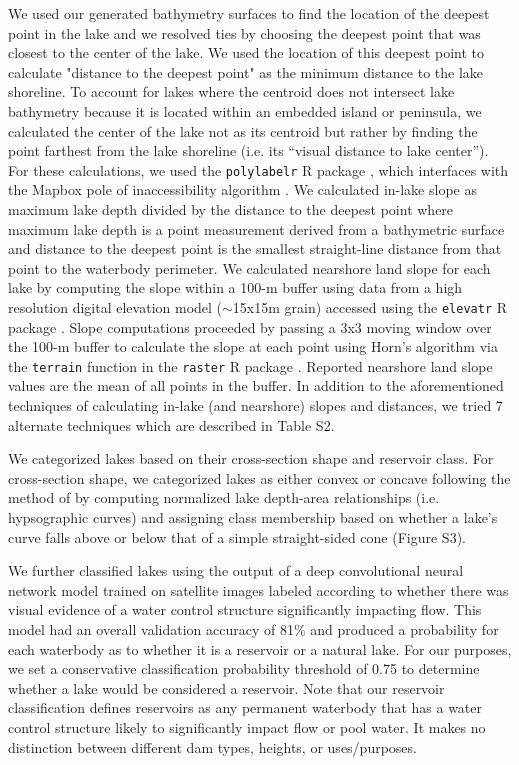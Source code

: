 \documentclass[draft]{agujournal2019}
\begin{document}
We used our generated bathymetry surfaces to find the location of the deepest point in the lake and we resolved ties by choosing the deepest point that was closest to the center of the lake. We used the location of this deepest point to calculate "distance to the deepest point" as the minimum distance to the lake shoreline. To account for lakes where the centroid does not intersect lake bathymetry because it is located within an embedded island or peninsula, we calculated the center of the lake not as its centroid but rather by finding the point farthest from the lake shoreline (i.e. its “visual distance to lake center”). For these calculations, we used the \texttt{polylabelr} R package \cite{larssonPolylabelrFindPole2019}, which interfaces with the Mapbox pole of inaccessibility algorithm \cite{agafonkinJSLibraryFinding2019}. We calculated in-lake slope as maximum lake depth divided by the distance to the deepest point where maximum lake depth is a point measurement derived from a bathymetric surface and distance to the deepest point is the smallest straight-line distance from that point to the waterbody perimeter. We calculated nearshore land slope for each lake by computing the slope within a 100-m buffer using data from a high resolution digital elevation model ($\sim$15x15m grain) accessed using the \texttt{elevatr} R package \cite{hollisterElevatrAccessElevation2017}. Slope computations proceeded by passing a 3x3 moving window over the 100-m buffer to calculate the slope at each point using Horn's algorithm via the \texttt{terrain} function in the \texttt{raster} R package \cite{hijmansRasterGeographicData2019}. Reported nearshore land slope values are the mean of all points in the buffer. In addition to the aforementioned techniques of calculating in-lake (and nearshore) slopes and distances, we tried 7 alternate techniques which are described in Table S2.

We categorized lakes based on their cross-section shape and reservoir class. For cross-section shape, we categorized lakes as either convex or concave following the method of  by computing normalized lake depth-area relationships (i.e. hypsographic curves) and assigning class membership based on whether a lake’s curve falls above or below that of a simple straight-sided cone (Figure S3).

We further classified lakes using the output of a deep convolutional neural network model trained on satellite images labeled according to whether there was visual evidence of a water control structure significantly impacting flow. This model had an overall validation accuracy of 81\% and produced a probability for each waterbody as to whether it is a reservoir or a natural lake. For our purposes, we set a conservative classification probability threshold of 0.75 to determine whether a lake would be considered a  reservoir. Note that our reservoir classification defines reservoirs as any permanent waterbody that has a water control structure likely to significantly impact flow or pool water. It makes no distinction between different dam types, heights, or uses/purposes.
\end{document}

